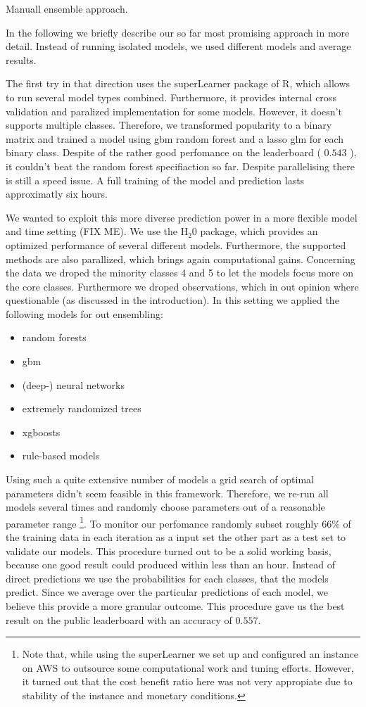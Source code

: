 \documentclass[fleqn]{article}
\begin{document}
Manuall ensemble approach. 

In the following we briefly describe our so far most promising approach in more detail. Instead of running isolated models, we used different models and average results. 

The first try in that direction uses the superLearner package of R, which allows to run several model types combined. Furthermore, it provides internal cross validation and paralized implementation for some models. However, it doesn't supports multiple classes. Therefore, we transformed popularity to a binary matrix and trained a model using gbm random forest and a lasso glm for each binary class. Despite of the rather good perfomance on the leaderboard ( $0.543$ ), it couldn't beat the random forest specifiaction so far. Despite parallelising there is still a speed issue. A full training of the model and prediction lasts approximatly six hours. 

We wanted to exploit this more diverse prediction power in a more flexible model and time setting (FIX ME). We use the H$_2$0 package, which provides an optimized performance of several different models. Furthermore, the supported methods are also parallized, which brings again computational gains. Concerning the data we droped the minority classes 4 and 5 to let the models focus more on the core classes. Furthermore we droped observations, which in out opinion where questionable (as discussed in the introduction). In this setting we applied the following models for out ensembling: 

\begin{itemize}
	\item random forests
	\item gbm
	\item (deep-) neural networks
	\item extremely randomized trees
	\item xgboosts
	\item rule-based models
\end{itemize}

Using such a quite extensive number of models a grid search of optimal parameters didn't seem feasible in this framework. Therefore, we re-run all models several times and randomly choose parameters out of a reasonable parameter range \footnote{Note that, while using the superLearner we set up and configured an instance on AWS to outsource some computational work and tuning efforts. However, it turned out that the cost benefit ratio here was not very appropiate due to stability of the instance and monetary conditions.}. To monitor our perfomance randomly subset roughly 66\% of the training data in each iteration as a input set the other part as a test set to validate our models. This procedure turned out to be a solid working basis, because one good result could produced within less than an hour. 
Instead of direct predictions we use the probabilities for each classes, that the models predict. Since we average over the particular predictions of each model, we believe this provide a more granular outcome. This procedure gave us the best result on the public leaderboard with an accuracy of $0.557$. 
\end{document}
